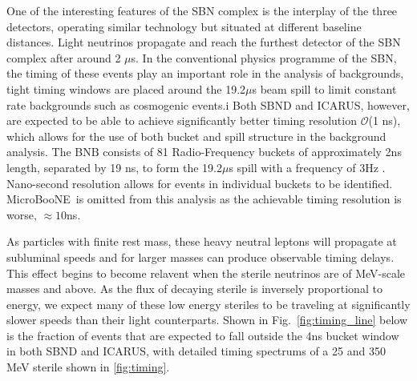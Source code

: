 \documentclass[11pt, a4paper]{article}
\newcommand{\reffig}[1]{Fig.~\ref{#1}}
\def\muboone{MicroBooNE}
\begin{document}
One of the interesting features of the SBN complex is the interplay of the
three detectors, operating similar technology but situated at different
baseline distances. Light neutrinos propagate and reach the furthest detector
of the SBN complex after around 2 $\mu$s. In the conventional physics programme
of the SBN, the timing of these events play an important role in the analysis
of backgrounds, tight timing windows are placed around the 19.2$\mu$s beam
spill to limit constant rate backgrounds such as cosmogenic events.i Both SBND
and ICARUS, however, are expected to be able to achieve significantly better
timing resolution $\mathcal{O}$(1 ns), which allows for the use of both bucket
and spill structure in the background analysis. The BNB consists of 81
Radio-Frequency buckets of approximately 2ns length, separated by 19 ns, to
form the 19.2$\mu$s spill with a frequency of 3Hz \cite{Antonello:2015ea}.
Nano-second resolution allows for events in individual buckets to be
identified. \muboone\ is omitted from this analysis as the achievable timing
resolution is worse, $\approx 10$ns.

As particles with finite rest mass, these heavy neutral leptons will propagate
at subluminal speeds and for larger masses can produce observable timing
delays. This effect begins to become relavent when the sterile neutrinos are of
MeV-scale masses and above. As the flux of decaying sterile is inversely
proportional to energy, we expect many of these low energy steriles to be
traveling at significantly slower speeds than their light counterparts. Shown
in \reffig{fig:timing_line} below is the fraction of events that are expected
to fall outside the 4ns bucket window in both SBND and ICARUS, with detailed
timing spectrums of a 25 and 350 MeV sterile shown in \ref{fig:timing}.
\end{document}

